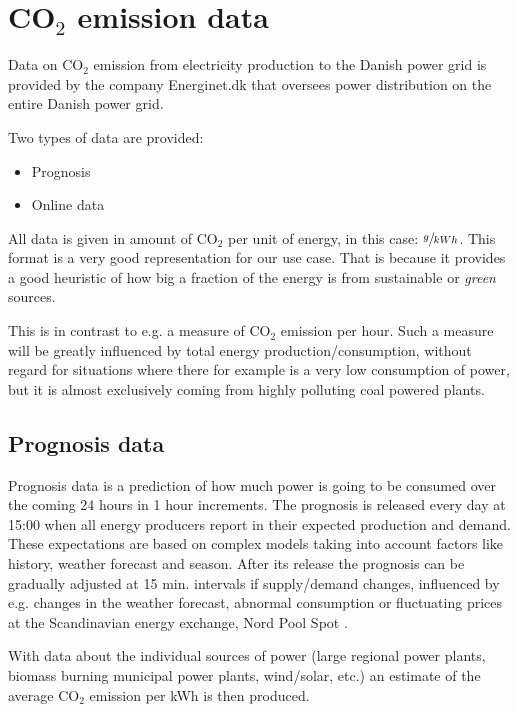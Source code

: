\documentclass[Main]{subfiles}
\begin{document}
\section{CO$_2$ emission data} %
\label{sub:c02_emission_data}

	Data on CO$_2$ emission from electricity production to the Danish power grid is provided by the company Energinet.dk that oversees power distribution on the entire Danish power grid.

	Two types of data are provided:
	\begin{itemize}
		\item Prognosis \cite{EnerginetFTPPrognosis:Online}
		\item Online data \cite{EnerginetFTPOnline:Online}
	\end{itemize}

	All data is given in amount of CO$_2$ per unit of energy, in this case: 
	$\sfrac{g}{kWh}$.
	This format is a very good representation for our use case.
	That is because it provides a good heuristic of how big a fraction of the energy is from sustainable or \emph{green} sources.
	
	This is in contrast to e.g. a measure of CO$_2$ emission per hour.
	Such a measure will be greatly influenced by total energy production/consumption, without regard for situations where there for example is a very low consumption of power, but it is almost exclusively coming from highly polluting coal powered plants.

	\subsection{Prognosis data} %
	\label{sub:prognosis}
		Prognosis data is a prediction of how much power is going to be consumed over the coming 24 hours in 1 hour increments.
		The prognosis is released every day at 15:00 when all energy producers report in their expected production and demand.
		These expectations are based on complex models taking into account factors like history, weather forecast and season.
		After its release the prognosis can be gradually adjusted at 15 min. intervals if supply/demand changes, influenced by e.g. changes in the weather forecast, abnormal consumption or fluctuating prices at the Scandinavian energy exchange, Nord Pool Spot \cite{NordPool:Online}.

		With data about the individual sources of power (large regional power plants, biomass burning municipal power plants, wind/solar, etc.) an estimate of the average CO$_2$ emission per kWh is then produced.
\end{document}
